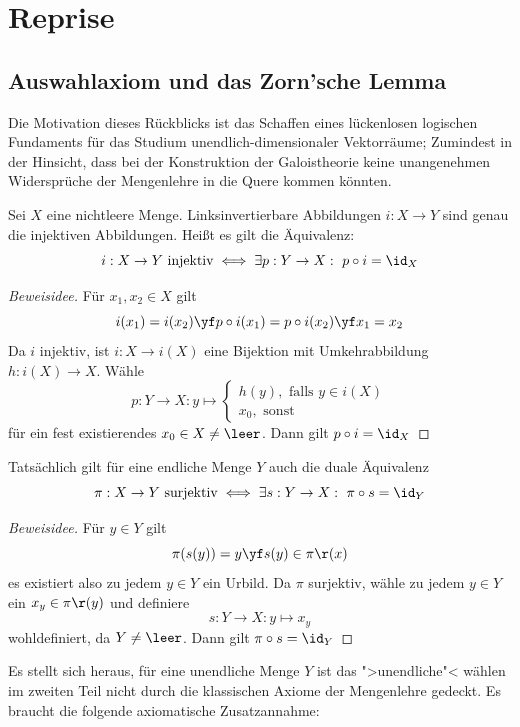 \documentclass[11pt, a4paper]{article}
\begin{document}

\tableofcontents

\newpage

\section{Reprise}

\subsection{Auswahlaxiom und das Zorn'sche Lemma}


\begin{note}
    Die Motivation dieses Rückblicks ist das Schaffen eines lückenlosen logischen Fundaments für das Studium unendlich-dimensionaler Vektorräume; Zumindest in der Hinsicht, dass bei der Konstruktion der Galoistheorie keine unangenehmen Widersprüche der Mengenlehre in die Quere kommen könnten.
\end{note}

\begin{lemma}
    Sei $X$ eine nichtleere Menge. Linksinvertierbare Abbildungen $i: X \to Y$ sind genau die injektiven Abbildungen. Heißt es gilt die Äquivalenz:
    $$i: X \to Y \text{ injektiv} \iff  \exists p: Y\to X: \ p\circ i=\id_X $$
    \begin{proof}[Beweisidee] \Rueck Für $x_1, x_2 \in X$ gilt $$i(x_1) = i(x_2) \yf p\circ i(x_1) = p\circ i(x_2) \yf x_1 = x_2$$
\Hin Da $i$ injektiv, ist $i: X \to i(X)$ eine Bijektion mit Umkehrabbildung $h: i(X) \to X$. Wähle
$$p: Y\longrightarrow X: y\longmapsto \begin{cases}
    h(y), \text{ falls } y\in i(X)\\
    x_0, \text{ sonst}
\end{cases}$$ 
für ein fest existierendes $x_0\in X\neq \leer$. Dann gilt $p\circ i= \id_X$
\end{proof}

\end{lemma}



\begin{note}
    Tatsächlich gilt für eine endliche Menge $Y$ auch die duale Äquivalenz 
    $$\pi : X\to Y \text{ surjektiv} \iff \exists s: Y\to X: \ \pi \circ s= \id_Y$$
    \begin{proof}[Beweisidee]
        \Rueck Für $y\in Y$ gilt
        $$\pi(s(y)) = y \yf s(y) \in \pi\r (x)$$ 
        es existiert also zu jedem $y\in Y$ ein Urbild.
        \Hin Da $\pi$ surjektiv, wähle zu jedem $y\in Y$ ein $x_y \in \pi\r (y)$ und definiere
        $$s: Y\longrightarrow X: y\longmapsto x_y$$
        wohldefiniert, da $Y\neq \leer$. Dann gilt $\pi \circ s=\id_Y$
    \end{proof}
    Es stellt sich heraus, für eine unendliche Menge $Y$ ist das ">unendliche"< wählen im zweiten Teil nicht durch die klassischen Axiome der Mengenlehre gedeckt. Es braucht die folgende axiomatische Zusatzannahme:
\end{note}
\end{document}
